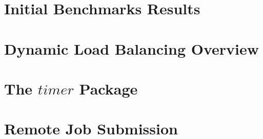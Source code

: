 \appendix
\section{Initial Benchmarks Results} 
\section{Dynamic Load Balancing Overview} 
\section{The $timer$ Package}\label{timer} 
\section{Remote Job Submission} 
